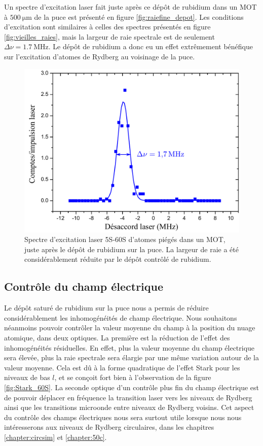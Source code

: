 Un spectre d'excitation laser fait juste après ce dépôt de rubidium dans un MOT à $\SI{500}{\um}$ de la puce est présenté en figure \eqref{fig:raiefine_depot}.
Les conditions d'excitation sont similaires à celles des spectres présentés en figure \eqref{fig:vieilles_raies}, mais la largeur de raie spectrale est de seulement $\Delta\nu=\SI{1.7}{\MHz}$.
Le dépôt de rubidium a donc eu un effet extrêmement bénéfique sur l'excitation d'atomes de Rydberg au voisinage de la puce.
%
\begin{figure}[h]
\centering
\includegraphics[width=.8\linewidth]{figures/raiefine_depot}
\caption[Spectre d'excitation laser 5S-60S juste après le dépôt de rubidium sur la puce]{
Spectre d'excitation laser 5S-60S d'atomes piégés dans un MOT, juste après le dépôt de rubidium sur la puce.
La largeur de raie a été considérablement réduite par le dépôt contrôlé de rubidium.
}
%

\label{fig:raiefine_depot}
\end{figure}

		
	\subsection{Contrôle du champ électrique}%
\noindent Le dépôt saturé de rubidium sur la puce nous a permis de réduire considérablement les inhomogénéités de champ électrique.
Nous souhaitons néanmoins pouvoir contrôler la valeur moyenne du champ à la position du nuage atomique, dans deux optiques.
La première est la réduction de l'effet des inhomogénéités résiduelles.
En effet, plus la valeur moyenne du champ électrique sera élevée, plus la raie spectrale sera élargie par une même variation autour de la valeur moyenne.
Cela est dû à la forme quadratique de l'effet Stark pour les niveaux de bas $l$, et se conçoit fort bien à l'observation de la figure \eqref{fig:Stark_60S}.
La seconde optique d'un contrôle plus fin du champ électrique est de pouvoir déplacer en fréquence la transition laser vers les niveaux de Rydberg ainsi que les transitions microonde entre niveaux de Rydberg voisins.
Cet aspect du contrôle des champs électriques nous sera surtout utile lorsque nous nous intéresserons aux niveaux de Rydberg circulaires, dans les chapitres \ref{chapter:circsim} et \ref{chapter:50c}.
	

